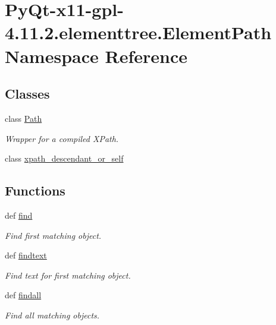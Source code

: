 \hypertarget{namespacePyQt-x11-gpl-4_811_82_1_1elementtree_1_1ElementPath}{}\section{Py\+Qt-\/x11-\/gpl-\/4.11.2.elementtree.\+Element\+Path Namespace Reference}
\label{namespacePyQt-x11-gpl-4_811_82_1_1elementtree_1_1ElementPath}
\subsection*{Classes}
\begin{DoxyCompactItemize}
\item 
class \hyperlink{classPyQt-x11-gpl-4_811_82_1_1elementtree_1_1ElementPath_1_1Path}{Path}
\begin{DoxyCompactList}\small\item\em Wrapper for a compiled X\+Path. \end{DoxyCompactList}\item 
class \hyperlink{classPyQt-x11-gpl-4_811_82_1_1elementtree_1_1ElementPath_1_1xpath__descendant__or__self}{xpath\+\_\+descendant\+\_\+or\+\_\+self}
\end{DoxyCompactItemize}
\subsection*{Functions}
\begin{DoxyCompactItemize}
\item 
def \hyperlink{namespacePyQt-x11-gpl-4_811_82_1_1elementtree_1_1ElementPath_a209098744f83674d80e735483c728ae1}{find}
\begin{DoxyCompactList}\small\item\em Find first matching object. \end{DoxyCompactList}\item 
def \hyperlink{namespacePyQt-x11-gpl-4_811_82_1_1elementtree_1_1ElementPath_af295a7cbfee378981fb3302670ce0e9e}{findtext}
\begin{DoxyCompactList}\small\item\em Find text for first matching object. \end{DoxyCompactList}\item 
def \hyperlink{namespacePyQt-x11-gpl-4_811_82_1_1elementtree_1_1ElementPath_ab4238714001e42ccf72712eb804cc9ed}{findall}
\begin{DoxyCompactList}\small\item\em Find all matching objects. \end{DoxyCompactList}\end{DoxyCompactItemize}
